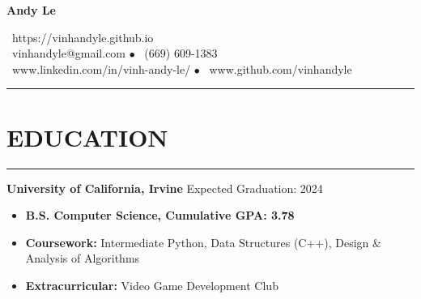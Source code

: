 \documentclass{article}
\begin{document}
   \begin{center}
      \Huge\textbf{Andy Le}\\
      \vspace{3pt}

      \normalsize{\faHome\ https://vinhandyle.github.io}\\

      \vspace{3pt}
      \normalsize{\faEnvelope\ vinhandyle@gmail.com} $\bullet$
      \normalsize{\faMobile\ (669) 609-1383} \\

      \vspace{3pt}
      \normalsize{\faLinkedinSquare\ www.linkedin.com/in/vinh-andy-le/} $\bullet$
      \normalsize{\faGithubSquare\ www.github.com/vinhandyle}
   \end{center}
\vspace{-5pt} \hrule \vspace{-5pt}

\section*{EDUCATION} \vspace{-6pt} \hrule \vspace{6pt}
\textbf{University of California, Irvine} \hfill Expected Graduation: 2024
\begin{itemize}
	\item\vspace{-6pt} \textbf{B.S. Computer Science, Cumulative GPA: 3.78}
	\item\vspace{-6pt}\textbf{Coursework:} Intermediate Python, Data Structures (C++), Design \& Analysis of Algorithms
	\item\vspace{-6pt}\textbf{Extracurricular:} Video Game Development Club
\end{itemize}
\vspace{-20pt}
\end{document}
